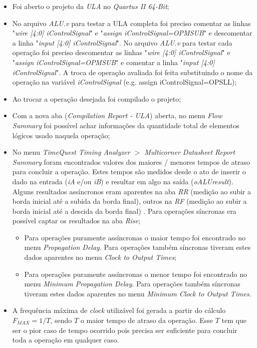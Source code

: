 \documentclass[12pt]{article}
\begin{document}
\begin{itemize}
	\item Foi aberto o projeto da \textit{ULA} no \textit{Quartus II 64-Bit};
	\item No arquivo \textit{ALU.v} para testar a ULA completa foi preciso comentar as linhas "\textit{wire [4:0]  iControlSignal}" e "\textit{assign iControlSignal=OPMSUB}" e descomentar a linha "\textit{input [4:0] iControlSignal}". No arquivo \textit{ALU.v} para testar cada operação foi preciso descomentar as linhas "\textit{wire [4:0]  iControlSignal}" e "\textit{assign iControlSignal=OPMSUB}" e comentar a linha "\textit{input [4:0] iControlSignal}". A troca de operação avaliada foi feita substituindo o nome da operação na variável \textit{iControlSignal} (e.g. assign iControlSignal=OPSLL);
	\item Ao trocar a operação desejada foi compilado o projeto;
	\item Com a nova aba (\textit{Compilation Report - ULA}) aberta, no menu \textit{Flow Summary} foi possível achar informações da quantidade total de elementos lógicos usado naquela operação;
	\item No menu \textit{TimeQuest Timing Analyzer $>$ Multicorner Datasheet Report Summary} foram encontrados valores dos maiores / menores tempos de atraso para concluir a operação. Estes tempos são medidos desde o ato de inserir o dado na entrada (\textit{iA} e/ou \textit{iB}) e resultar em algo na saída (\textit{oALUresult}). Alguns resultados assíncronos eram aparentes na aba \textit{RR} (medição ao subir a borda inicial até a subida da borda final), outros na \textit{RF} (medição ao subir a borda inicial até a descida da borda final) \cite{altera}. Para operações síncronas era possível captar os resultados na aba \textit{Rise};
		\begin{itemize}
			\item Para operações puramente assíncronas o maior tempo foi encontrado no menu \textit{Propagation Delay}. Para operações também síncronas tiveram estes dados aparentes no menu \textit{Clock to Output Times}; 
			\item Para operações puramente assíncronas o menor tempo foi encontrado no menu \textit{Minimum Propagation Delay}. Para operações também síncronas tiveram estes dados aparentes no menu \textit{Minimum Clock to Output Times}. 
		\end{itemize}
	\item A frequência máxima de \textit{clock} utilizável foi gerada a partir do cálculo $F_{MAX} = 1/T$, sendo $T$ o maior tempo de atraso da operação. Esse $T$ tem que ser o pior caso de tempo ocorrido pois precisa ser suficiente para concluir toda a operação em qualquer caso.
\end{itemize}
\end{document}
